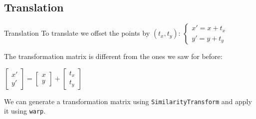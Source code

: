 \documentclass[9pt, aspectratio=169]{beamer}
\begin{document}
\subsection{Translation}

\begin{frame}
    {Translation}
    To translate we offset the points by $(t_x, t_y)$: $\begin{cases}x' = x + t_x\\y' = y + t_y\end{cases}$

    The transformation matrix is different from the ones we saw for before:

    $\begin{bmatrix}x'\\y'\end{bmatrix} = \begin{bmatrix}x\\y\end{bmatrix} + \begin{bmatrix}t_x\\t_y\end{bmatrix}$

    \pause
    We can generate a transformation matrix using \texttt{SimilarityTransform} and apply it using \texttt{warp}.


\end{frame}
\end{document}
